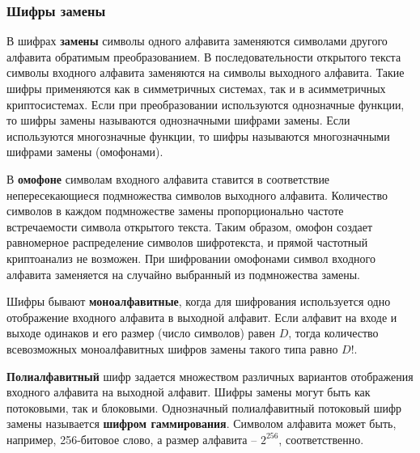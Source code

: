 \subsubsection{Шифры замены}

В шифрах \textbf{замены} символы одного алфавита заменяются символами другого алфавита обратимым преобразованием. В последовательности открытого текста символы входного алфавита заменяются на символы выходного алфавита. Такие шифры применяются как в симметричных системах, так и в асимметричных криптосистемах. Если при преобразовании используются однозначные функции, то шифры замены называются однозначными шифрами замены. Если используются многозначные функции, то шифры называются многозначными шифрами замены (омофонами).

В \textbf{омофоне} символам входного алфавита ставится в соответствие непересекающиеся подмножества символов выходного алфавита. Количество символов в каждом подмножестве замены пропорционально частоте встречаемости символа открытого текста. Таким образом, омофон создает равномерное распределение символов шифротекста, и прямой частотный криптоанализ не возможен. При шифровании омофонами символ входного алфавита заменяется на случайно выбранный из подмножества замены.

Шифры бывают \textbf{моноалфавитные}, когда для шифрования используется одно отображение входного алфавита в выходной алфавит. Если алфавит на входе и выходе одинаков и его размер (число символов) равен $D$, тогда количество всевозможных моноалфавитных шифров замены такого типа равно $D!$.

\textbf{Полиалфавитный} шифр задается множеством различных вариантов отображения входного алфавита на выходной алфавит. Шифры замены могут быть как потоковыми, так и блоковыми. Однозначный полиалфавитный потоковый шифр замены называется \textbf{шифром гаммирования}. Символом алфавита может быть, например, 256-битовое слово, а размер алфавита -- $2^{256}$, соответственно.

